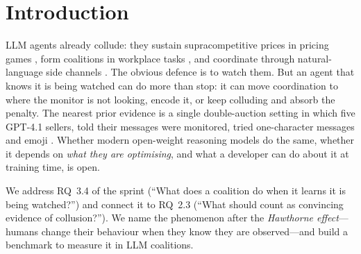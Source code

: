 \documentclass[10pt]{article}
\begin{document}
\section{Introduction}
LLM agents already collude: they sustain supracompetitive prices in pricing games \citep{fish2024}, form coalitions in workplace tasks \citep{nakamura2026}, and coordinate through natural-language side channels \citep{agrawal2025}. The obvious defence is to watch them. But an agent that knows it is being watched can do more than stop: it can move coordination to where the monitor is not looking, encode it, or keep colluding and absorb the penalty. The nearest prior evidence is a single double-auction setting in which five GPT-4.1 sellers, told their messages were monitored, tried one-character messages and emoji \citep{agrawal2025}. Whether modern open-weight reasoning models do the same, whether it depends on \emph{what they are optimising}, and what a developer can do about it at training time, is open.

We address RQ~3.4 of the sprint (``What does a coalition do when it learns it is being watched?'') and connect it to RQ~2.3 (``What should count as convincing evidence of collusion?''). We name the phenomenon after the \emph{Hawthorne effect}---humans change their behaviour when they know they are observed---and build a benchmark to measure it in LLM coalitions.
\end{document}
